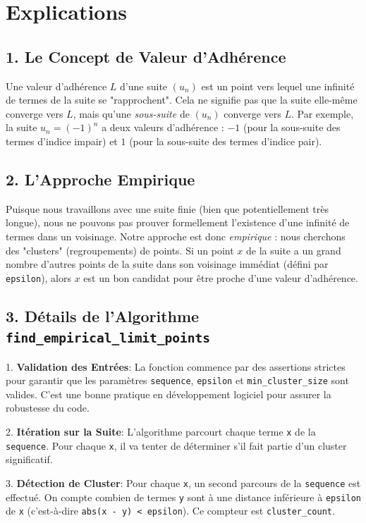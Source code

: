 \documentclass{report}
\begin{document}
\section*{Explications}

\subsection*{1. Le Concept de Valeur d'Adhérence}

Une valeur d'adhérence $L$ d'une suite $(u_n)$ est un point vers lequel une infinité de termes de la suite se "rapprochent". Cela ne signifie pas que la suite elle-même converge vers $L$, mais qu'une \textit{sous-suite} de $(u_n)$ converge vers $L$. Par exemple, la suite $u_n = (-1)^n$ a deux valeurs d'adhérence : $-1$ (pour la sous-suite des termes d'indice impair) et $1$ (pour la sous-suite des termes d'indice pair).

\subsection*{2. L'Approche Empirique}

Puisque nous travaillons avec une suite finie (bien que potentiellement très longue), nous ne pouvons pas prouver formellement l'existence d'une infinité de termes dans un voisinage. Notre approche est donc \textit{empirique} : nous cherchons des "clusters" (regroupements) de points. Si un point $x$ de la suite a un grand nombre d'autres points de la suite dans son voisinage immédiat (défini par \texttt{epsilon}), alors $x$ est un bon candidat pour être proche d'une valeur d'adhérence.

\subsection*{3. Détails de l'Algorithme \texttt{find\_empirical\_limit\_points}}

1.  \textbf{Validation des Entrées}: La fonction commence par des assertions strictes pour garantir que les paramètres \texttt{sequence}, \texttt{epsilon} et \texttt{min\_cluster\_size} sont valides. C'est une bonne pratique en développement logiciel pour assurer la robustesse du code.

2.  \textbf{Itération sur la Suite}: L'algorithme parcourt chaque terme \texttt{x} de la \texttt{sequence}. Pour chaque \texttt{x}, il va tenter de déterminer s'il fait partie d'un cluster significatif.

3.  \textbf{Détection de Cluster}: Pour chaque \texttt{x}, un second parcours de la \texttt{sequence} est effectué. On compte combien de termes \texttt{y} sont à une distance inférieure à \texttt{epsilon} de \texttt{x} (c'est-à-dire \texttt{abs(x - y) < epsilon}). Ce compteur est \texttt{cluster\_count}.
\end{document}
